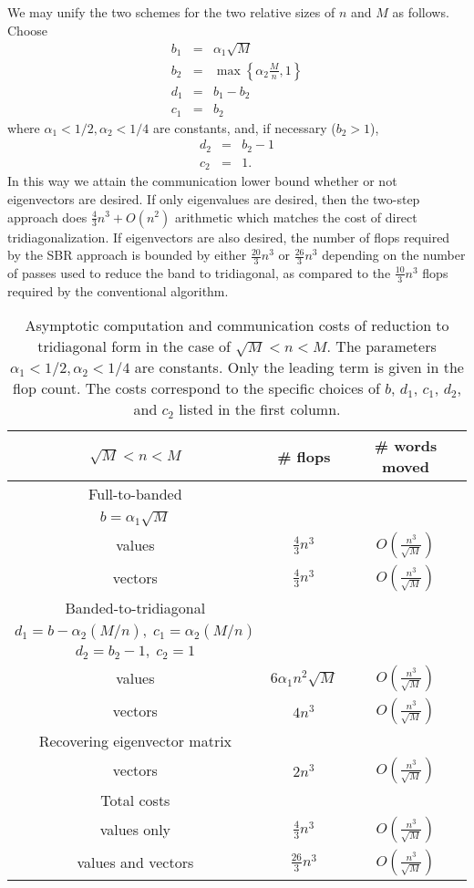 \documentclass{article}
\def\lt{\left}
\def\rt{\right}
\theoremstyle{definition}
\begin{document}
We may unify the two schemes for the two relative sizes of $n$ and $M$ as follows.  Choose
\begin{eqnarray*}
b_1 &=& \alpha_1 \sqrt M \\
b_2 &=& \max \lt\{ \alpha_2 \frac Mn, 1 \rt\} \\
d_1 &=& b_1 - b_2 \\
c_1 &=& b_2 
\end{eqnarray*}
where $\alpha_1 < 1/2, \alpha_2 < 1/4$ are constants, and, if necessary ($b_2>1$),
\begin{eqnarray*}
d_2 &=& b_2-1 \\
c_2 &=& 1.
\end{eqnarray*} 
In this way we attain the communication lower bound whether or not eigenvectors are desired.  If only eigenvalues are desired, then the two-step approach does $\frac43 n^3 + O(n^2)$ arithmetic which matches the cost of direct tridiagonalization.  If eigenvectors are also desired, the number of flops required by the SBR approach is bounded by either $\frac{20}{3}n^3$ or $\frac{26}{3}n^3$ depending on the number of passes used to reduce the band to tridiagonal, as compared to the $\frac{10}{3}n^3$ flops required by the conventional algorithm.

\begin{table} \centering
  \begin{tabular}{| c | c | c |} \hline
      $\sqrt M < n < M$ & \# flops & \# words moved \\ \hline \hline
    Full-to-banded & & \\
    $b=\alpha_1 \sqrt M$ & & \\
    values & $\frac43 n^3$ & $O\lt(\frac{n^3}{\sqrt M}\rt)$\\
    vectors & $\frac43 n^3$ & $O\lt(\frac{n^3}{\sqrt M}\rt)$ \\ \hline
    Banded-to-tridiagonal & & \\
    $d_1 = b-\alpha_2 (M/n), \; c_1 = \alpha_2 (M/n)$ & & \\
    $d_2 = b_2-1, \; c_2 = 1$ & & \\
    values & $6\alpha_1n^2\sqrt M$ & $O\lt(\frac{n^3}{\sqrt M}\rt)$ \\
    vectors & $4 n^3$ & $O\lt(\frac{n^3}{\sqrt M}\rt)$ \\ \hline
    Recovering eigenvector matrix & & \\
    vectors & $2n^3$ & $O\lt(\frac{n^3}{\sqrt M}\rt)$ \\ \hline \hline
    Total costs & & \\
    values only & $\frac43 n^3$ & $O\lt(\frac{n^3}{\sqrt M}\rt)$ \\
    values and vectors & $\frac{26}{3}n^3$ & $O\lt(\frac{n^3}{\sqrt M}\rt)$ \\ \hline
  \end{tabular}
  \caption{Asymptotic computation and communication costs of reduction to tridiagonal form in the case of $\sqrt M < n < M$.  The parameters $\alpha_1 < 1/2, \alpha_2 < 1/4$ are constants.  Only the leading term is given in the flop count.  The costs correspond to the specific choices of $b$, $d_1$, $c_1$, $d_2$, and $c_2$ listed in the first column.}
  \label{tab:SBRcase1}
\end{table}
\end{document}
